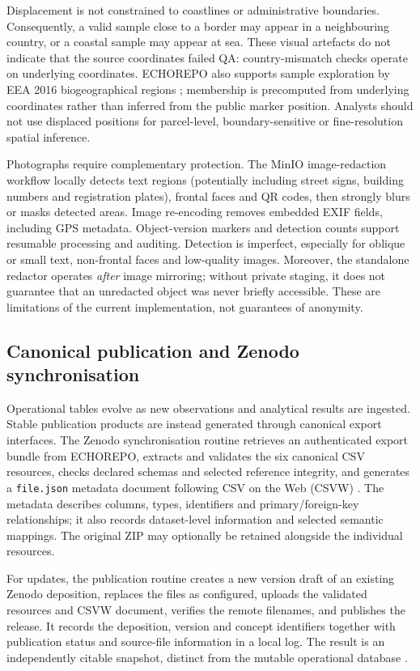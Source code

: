 \documentclass[11pt,a4paper]{article}
\newcommand{\code}[1]{\texttt{#1}}
\begin{document}
Displacement is not constrained to coastlines or administrative boundaries. Consequently, a valid sample close to a border may appear in a neighbouring country, or a coastal sample may appear at sea. These visual artefacts do not indicate that the source coordinates failed QA: country-mismatch checks operate on underlying coordinates. ECHOREPO also supports sample exploration by EEA 2016 biogeographical regions \parencite{eea2016biogeo}; membership is precomputed from underlying coordinates rather than inferred from the public marker position. Analysts should not use displaced positions for parcel-level, boundary-sensitive or fine-resolution spatial inference.



Photographs require complementary protection. The MinIO image-redaction workflow locally detects text regions (potentially including street signs, building numbers and registration plates), frontal faces and QR codes, then strongly blurs or masks detected areas. Image re-encoding removes embedded EXIF fields, including GPS metadata. Object-version markers and detection counts support resumable processing and auditing. Detection is imperfect, especially for oblique or small text, non-frontal faces and low-quality images. Moreover, the standalone redactor operates \emph{after} image mirroring; without private staging, it does not guarantee that an unredacted object was never briefly accessible. These are limitations of the current implementation, not guarantees of anonymity.

\subsection{Canonical publication and Zenodo synchronisation}
Operational tables evolve as new observations and analytical results are ingested. Stable publication products are instead generated through canonical export interfaces. The Zenodo synchronisation routine retrieves an authenticated export bundle from ECHOREPO, extracts and validates the six canonical CSV resources, checks declared schemas and selected reference integrity, and generates a \code{file.json} metadata document following CSV on the Web (CSVW) \parencite{w3c2015csvw}. The metadata describes columns, types, identifiers and primary/foreign-key relationships; it also records dataset-level information and selected semantic mappings. The original ZIP may optionally be retained alongside the individual resources.

For updates, the publication routine creates a new version draft of an existing Zenodo deposition, replaces the files as configured, uploads the validated resources and CSVW document, verifies the remote filenames, and publishes the release. It records the deposition, version and concept identifiers together with publication status and source-file information in a local log. The result is an independently citable snapshot, distinct from the mutable operational database \parencite{zenodo2026versioning,echorepo2026dataset}.
\end{document}
